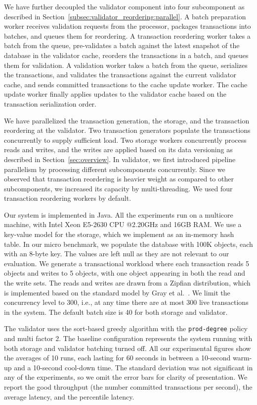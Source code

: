 We have further decoupled the validator component into four subcomponent as described in Section~\ref{subsec:validator_reordering:parallel}. A batch preparation worker receives validation requests from the processor, packages transactions into batches, and queues them for reordering. A transaction reordering worker takes a batch from the queue, pre-validates a batch against the latest snapshot of the database in the validator cache, reorders the transactions in a batch, and queues them for validation. A validation worker takes a batch from the queue, serializes the transactions, and validates the transactions against the current validator cache, and sends committed transactions to the cache update worker. The cache update worker finally applies updates to the validator cache based on the transaction serialization order. 

We have parallelized the transaction generation, the storage, and the transaction reordering at the validator. Two transaction generators populate the transactions concurrently to supply sufficient load. Two storage workers concurrently process reads and writes, and the writes are applied based on its data versioning as described in Section~\ref{sec:overview}. In validator, we first introduced pipeline parallelism by processing different subcomponents concurrently. Since we observed that transaction reordering is heavier weight as compared to other subcomponents, we increased its capacity by multi-threading. We used four transaction reordering workers by default.


Our system is implemented in Java. All the experiments run on a multicore machine, with Intel Xeon E5-2630 CPU @2.20GHz and 16GB RAM. We use a key-value model for the storage, which we implement as an in-memory hash table. In our micro benchmark, we populate the database with 100K objects, each with an 8-byte key. The values are left null as they are not relevant to our evaluation. We generate a transactional workload where each transaction reads 5 objects and writes to 5 objects, with one object appearing in both the read and the write sets. The reads and writes are drawn from a Zipfian distribution, which is implemented based on the standard model by Gray et al.~\cite{gray1994quickly}. We limit the concurrency level to 300, i.e., at any time there are at most 300 live transactions in the system. The default batch size is 40 for both storage and validator.

The validator uses the sort-based greedy algorithm with the \texttt{prod-degree} policy and multi factor 2. The baseline configuration represents the system running with both storage and validator batching turned off.  All our experimental figures show the averages of 10 runs, each lasting for 60 seconds in between a 10-second warm-up and a 10-second cool-down time. The standard deviation was not significant in any of the experiments, so we omit the error bars for clarity of presentation. We report the good throughput (the number committed transactions per second), the average latency, and the percentile latency.


